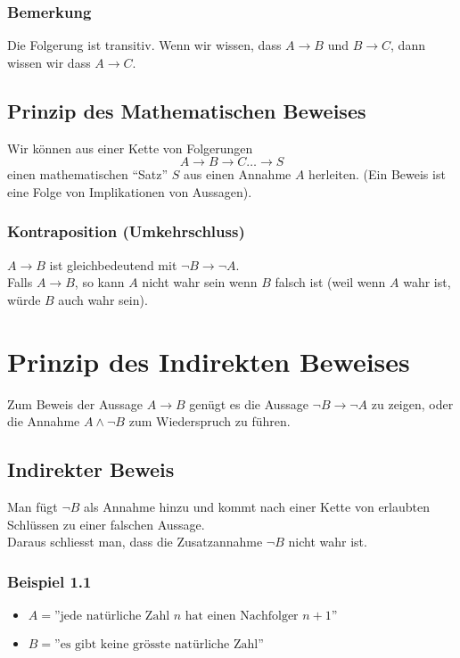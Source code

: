 \subsubsection*{Bemerkung}
Die Folgerung ist transitiv. Wenn wir wissen, dass $A\to B$ und $B\to C$, dann wissen wir dass $A\to C$.


\subsection*{Prinzip des Mathematischen Beweises}
Wir können aus einer Kette von Folgerungen \[A\to B \to C \dots \to S\]
einen mathematischen ``Satz'' $S$ aus einen Annahme $A$ herleiten. (Ein Beweis ist eine Folge von Implikationen von Aussagen). 
\subsubsection*{Kontraposition (Umkehrschluss)}

$A\to B$ ist gleichbedeutend mit $\lnot B\to\lnot A$.\\
Falls $A\to B$, so kann $A$ nicht wahr sein wenn $B$ falsch ist (weil wenn $A$ wahr ist, würde $B$ auch wahr sein).

\section{Prinzip des Indirekten Beweises}
Zum Beweis der Aussage $A\to B$ genügt es die Aussage $\lnot B\to\lnot A$ zu zeigen, oder die Annahme $A\land\lnot B$ zum Wiederspruch zu führen.

\subsection*{Indirekter Beweis}
Man fügt $\lnot B$ als Annahme hinzu und kommt nach einer Kette von erlaubten Schlüssen zu einer falschen Aussage.\\

\noindent Daraus schliesst man, dass die Zusatzannahme $\lnot B$ nicht wahr ist. 

\subsubsection*{Beispiel 1.1}
\begin{itemize}
\item $A=\text{''jede natürliche Zahl } n \text{ hat einen Nachfolger } n+1\text{''}$
\item $B=\text{''es gibt keine grösste natürliche Zahl''}$
\end{itemize}

